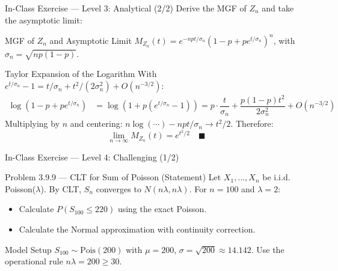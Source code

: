 \documentclass[aspectratio=169,xcolor={dvipsnames,table}]{beamer}
\begin{document}
\begin{frame}{In-Class Exercise --- Level 3: Analytical (2/2)}
	\vspace{-0.05cm}
	\scriptsize
	Derive the MGF of $Z_{n}$ and take the asymptotic limit: \pause
	\begin{block}{MGF of $Z_{n}$ and Asymptotic Limit}
		\scriptsize
		$M_{Z_{n}}(t) = e^{-npt/\sigma_{n}} (1 - p + p e^{t/\sigma_{n}})^{n}$, with $\sigma_{n} = \sqrt{np(1-p)}$.
	\end{block}
	\vspace{0.05cm}
	\pause
	\begin{alertblock}{Taylor Expansion of the Logarithm}
		\scriptsize
		With $e^{t/\sigma_{n}} - 1 = t/\sigma_{n} + t^{2}/(2\sigma_{n}^{2}) + O(n^{-3/2})$:
		\begin{align*}
			\log(1 - p + p e^{t/\sigma_{n}}) &= \log(1 + p(e^{t/\sigma_{n}} - 1)) = p \cdot \dfrac{t}{\sigma_{n}} + \dfrac{p(1-p)t^{2}}{2\sigma_{n}^{2}} + O(n^{-3/2})
		\end{align*}
		Multiplying by $n$ and centering: $n \log(\cdots) - npt/\sigma_{n} \to t^{2}/2$. Therefore:
		$$\lim_{n \to \infty} M_{Z_{n}}(t) = e^{t^{2}/2} \quad \blacksquare$$
	\end{alertblock}
\end{frame}

\begin{frame}{In-Class Exercise --- Level 4: Challenging (1/2)}
	\vspace{-0.1cm}
	\begin{block}{Problem 3.9.9 --- CLT for Sum of Poisson (Statement)}
		Let $X_{1}, \dots, X_{n}$ be i.i.d. Poisson($\lambda$). By CLT, $S_{n}$ converges to $N(n\lambda, n\lambda)$. For $n = 100$ and $\lambda = 2$:
		\begin{itemize}\itemsep=0.04cm
			\item Calculate $P(S_{100} \le 220)$ using the exact Poisson.
			\item Calculate the Normal approximation with continuity correction.
		\end{itemize}
	\end{block}
	\vspace{0.15cm}
	\pause
	\begin{alertblock}{Model Setup}
		\scriptsize
		$S_{100} \sim \text{Pois}(200)$ with $\mu = 200$, $\sigma = \sqrt{200} \approx 14.142$. Use the operational rule $n\lambda = 200 \ge 30$.
	\end{alertblock}
\end{frame}
\end{document}
